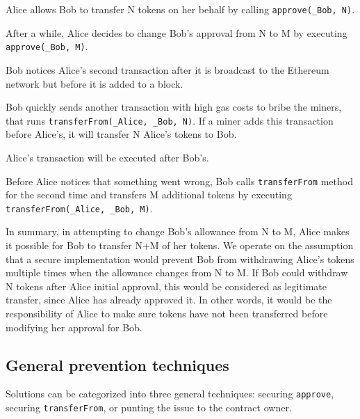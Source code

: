 \begin{compactlistn}
	\item Alice allows Bob to transfer N tokens on her behalf by calling \texttt{approve(\_Bob, N)}.
	\item After a while, Alice decides to change Bob's approval from N to M by executing \texttt{approve(\_Bob, M)}.
	\item Bob notices Alice's second transaction after it is broadcast to the Ethereum network but before it is added to a block. 
	\item Bob quickly sends another transaction with high gas costs to bribe the miners, that runs \texttt{transferFrom(\_Alice, \_Bob, N)}. If a miner adds this transaction before Alice's, it will transfer N Alice's tokens to Bob.
	\item Alice's transaction will be executed after Bob's.
	\item Before Alice notices that something went wrong, Bob calls \texttt{transferFrom} method for the second time and transfers M additional tokens by executing \texttt{transferFrom(\_Alice, \_Bob, M)}.
\end{compactlistn}

In summary, in attempting to change Bob's allowance from N to M, Alice makes it possible for Bob to transfer N+M of her tokens. We operate on the assumption that a secure implementation would prevent Bob from withdrawing Alice's tokens multiple times when the allowance changes from N to M. If Bob could withdraw N tokens after Alice initial approval, this would be considered as legitimate transfer, since Alice has already approved it. In other words, it would be the responsibility of Alice to make sure tokens have not been transferred before modifying her approval for Bob.

\subsection{General prevention techniques}

Solutions can be categorized into three general techniques: securing \texttt{approve}, securing \texttt{transferFrom}, or punting the issue to the contract owner. 

